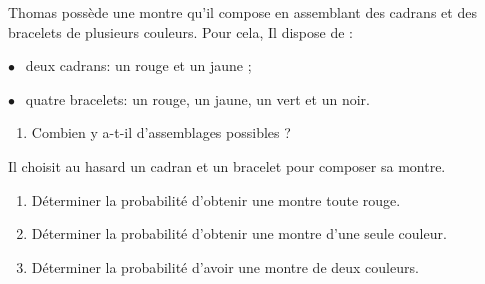 
\medskip 

Thomas possède une montre qu'il compose en assemblant des cadrans et des bracelets de
plusieurs couleurs. Pour cela, Il dispose de :

\qquad $\bullet~~$ deux cadrans: un rouge et un jaune ;

\qquad $\bullet~~$ quatre bracelets: un rouge, un jaune, un vert et un noir.

\medskip

\begin{enumerate}
\item Combien y a-t-il d'assemblages possibles ?
\end{enumerate}
\medskip

Il choisit au hasard un cadran et un bracelet pour composer sa montre.
\smallskip

\begin{enumerate}[resume]
\item Déterminer la probabilité d'obtenir une montre toute rouge.
\item Déterminer la probabilité d'obtenir une montre d'une seule couleur.
\item Déterminer la probabilité d'avoir une montre de deux couleurs.
\end{enumerate}

\vspace{0.5cm}

